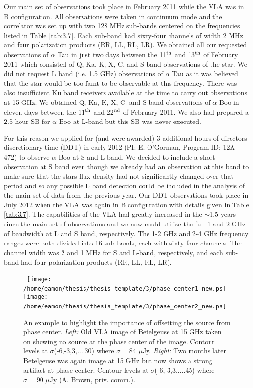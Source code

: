 Our main set of observations took place in February 2011 while the VLA was in B configuration. All observations were taken in continuum mode and the correlator was set up with two 128 MHz sub-bands centered on the frequencies listed in Table \ref{tab:3.7}. Each sub-band had sixty-four channels of width 2 MHz and four polarization products (RR, LL, RL, LR). We obtained all our requested observations of $\alpha$ Tau in just two days between the 11$^{\rm{th}}$ and 13$^{\rm{th}}$ of February 2011 which consisted of Q, Ka, K, X, C, and S band observations of the star. We did not request L band (i.e. 1.5 GHz) observations of $\alpha$ Tau as it was believed that the star would be too faint to be observable at this frequency. There was also insufficient Ku band receivers available at the time to carry out observations at 15 GHz. We obtained Q, Ka, K, X, C, and S band observations of $\alpha$ Boo in eleven days between the 11$^{\rm{th}}$ and 22$^{\rm{nd}}$ of February 2011. We also had prepared a 2.5 hour SB for $\alpha$ Boo at L-band but this SB was never executed. 

For this reason we applied for (and were awarded) 3 additional hours of directors discretionary time (DDT) in early 2012 (PI: E. O'Gorman, Program ID: 12A-472) to observe $\alpha$ Boo at S and L band. We decided to include a short observation at S band even though we already had an observation at this band to make sure that the stars flux density had not significantly changed over that period and so any possible L band detection could be included in the analysis of the main set of data from the previous year. Our DDT observations took place in July 2012 when the VLA was again in B configuration with details given in Table \ref{tab:3.7}. The capabilities of the VLA had greatly increased in the $\sim 1.5$ years since the main set of observations and we now could utilize the full 1 and 2 GHz of bandwidth at L and S band, respectively. The 1-2 GHz and 2-4 GHz frequency ranges were both divided into 16 sub-bands, each with sixty-four channels. The channel width was 2 and 1 MHz for S and L-band, respectively, and each sub-band had four polarization products (RR, LL, RL, LR).

\begin{figure}[hbt!]
\centering 
\mbox{
          \texttt{[image: /home/eamon/thesis/thesis\_template/3/phase\_center1\_new.ps]}
          \texttt{[image: /home/eamon/thesis/thesis\_template/3/phase\_center2\_new.ps]}
          }
\caption[Importance of offsetting source from phase center.]{An example to highlight the importance of offsetting the source from phase center. \textit{Left:} Old VLA image of Betelgeuse at 15 GHz taken on showing no source at the phase center of the image. Contour levels at $\sigma$(-6,-3,3,....30) where $\sigma = 84$ $\mu$Jy. \textit{Right:} Two months later Betelgeuse was again image at 15 GHz but now shows a strong artifact at phase center. Contour levels at $\sigma$(-6,-3,3,....45) where $\sigma = 90$ $\mu$Jy (A. Brown, priv. comm.).}
\label{fig:3.6}
\end{figure}

